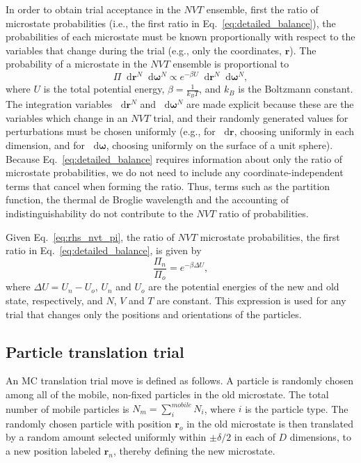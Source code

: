 \documentclass[
  9pt,
  bestpractices,
  pubversion,
]{livecoms}
\newcommand*\diff{\mathop{}\!\mathrm{d}}
\begin{document}
In order to obtain trial acceptance in the $NVT$ ensemble, first the ratio of microstate probabilities (i.e., the first ratio in Eq.~\ref{eq:detailed_balance}), the probabilities of each microstate must be known proportionally with respect to the variables that change during the trial (e.g., only the coordinates, $\mathbf{r}$).
The probability of a microstate in the $NVT$ ensemble is proportional to \cite{allen_computer_1989, frenkel_understanding_2002}
\begin{equation}
\Pi \diff\mathbf{r}^N\diff\boldsymbol{\omega}^N \propto e^{-\beta U} \diff\mathbf{r}^N\diff\boldsymbol{\omega}^N,
\label{eq:rhs_nvt_pi}
\end{equation}
where $U$ is the total potential energy, $\beta=\frac{1}{k_B T}$, and $k_B$ is the Boltzmann constant.
The integration variables $\diff\mathbf{r}^{N}$ and $\diff\boldsymbol{\omega}^{N}$ are made explicit because these are the variables which change in an $NVT$ trial, and their randomly generated values for perturbations must be chosen uniformly (e.g., for $\diff\mathbf{r}$, choosing uniformly in each dimension, and for $\diff\boldsymbol{\omega}$, choosing uniformly on the surface of a unit sphere).
Because Eq.~\ref{eq:detailed_balance} requires information about only the ratio of microstate probabilities, we do not need to include any coordinate-independent terms that cancel when forming the ratio.
Thus, terms such as the partition function, the thermal de Broglie wavelength and the accounting of indistinguishability do not contribute to the $NVT$ ratio of probabilities.

Given Eq.~\ref{eq:rhs_nvt_pi}, the ratio of $NVT$ microstate probabilities, the first ratio in Eq.~\ref{eq:detailed_balance}, is given by
\begin{equation}
\frac{\Pi_n}{\Pi_o} = e^{-\beta\Delta U},
\label{eq:rhs_nvt}
\end{equation}
where $\Delta U = U_n - U_o$, $U_n$ and $U_o$ are the potential energies of the new and old state, respectively, and $N$, $V$ and $T$ are constant.
This expression is used for any trial that changes only the positions and orientations of the particles.

\subsection{\label{sec:lhs_translation}Particle translation trial}

An MC translation trial move is defined as follows.
A particle is randomly chosen among all of the mobile, non-fixed particles in the old microstate.
The total number of mobile particles is $N_m=\sum_i^{mobile} N_i$, where $i$ is the particle type.
The randomly chosen particle with position $\mathbf{r}_o$ in the old microstate is then translated by a random amount selected uniformly within $\pm\delta/2$ in each of $D$ dimensions, to a new position labeled $\mathbf{r}_n$, thereby defining the new microstate.
\end{document}
